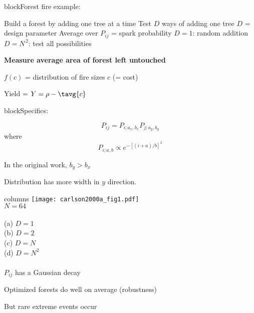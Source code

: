   

{block}{Forest fire example:\cite{carlson2000a}}
    
     Build a forest by adding one tree at a time
     Test $D$ ways of adding one tree
     $D$ = \alert{design parameter}
     Average over $P_{ij}$ = spark probability
     $D=1$: random addition
     $D=N^{\, 2}$: test all possibilities
    
  

  \textbf{Measure average area of forest left untouched}
    
     
      $f(c)$ = distribution of fire sizes $c$ (= cost)
     
      Yield  = $Y = \rho - \tavg{c}$
    
  

{block}{Specifics:}
    
     
      $$ P_{ij} = P_{i;a_x,b_x} P_{j;a_y,b_y}$$
      where
      $$ P_{i;a,b}
      \propto
      e^{-[(i+a)/b]^2}
      $$
    
      In the original work, $b_y > b_x$
    
      Distribution has more width in $y$ direction.
    
        
  

{columns} 
          \texttt{[image: carlson2000a\_fig1.pdf]}\cite{carlson2000a}\\
              $N=64$\\
      \mbox{}\\
      \alert{(a)} $D=1$\\
      \alert{(b)} $D=2$\\ 
      \alert{(c)} $D=N$\\
      \alert{(d)} $D = N^2$\\
      \mbox{}\\
      $P_{ij}$ has a Gaussian decay
      
  
  
    Optimized forests do well on average {\alert{(robustness)}}
  
    But rare extreme events occur {}
  
  




